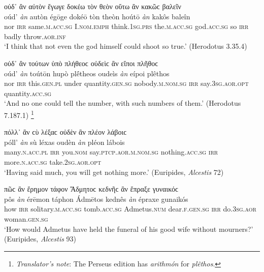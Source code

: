 \begin{exe}
\ex ούδ᾽ ἂν αὐτὸν ἔγωγε δοκέω τὸν θεὸν οὕτω ἂν κακῶϲ βαλεῖν\\
\gll oúd' \emph{àn} autòn égōge dokéō tòn theòn hoútō \emph{àn} kakôs baleîn\\
nor \textsc{irr} same.\textsc{m.acc.sg} I.\textsc{nom.emph} think.\textsc{1sg.prs} the.\textsc{m.acc.sg} god.\textsc{acc.sg} so \textsc{irr} badly throw.\textsc{aor.inf}\\
\trans `I think that not even the god himself could shoot so true.' (Herodotus 3.35.4)
\label{multian22}
\end{exe}

\begin{exe}
\ex οὐδ᾽ ἂν τούτων ὑπὸ πλήθεοϲ οὐδεὶϲ ἂν εἴποι πλῆθοϲ\\
\gll oúd' \emph{àn} toútōn hupò plḗtheos oudeìs \emph{àn} eípoi plêthos\\
nor \textsc{irr} this.\textsc{gen.pl} under quantity.\textsc{gen.sg} nobody.\textsc{m.nom.sg} \textsc{irr} say.\textsc{3sg.aor.opt} quantity.\textsc{acc.sg}\\
\trans `And no one could tell the number, with such numbers of them.' (Herodotus 7.187.1)
\label{multian23}\footnote{\emph{Translator's note}: The Perseus edition has \textit{arithmón} for \textit{plêthos}.}
\end{exe}

\begin{exe}
\ex πόλλ᾽ ἂν ϲὺ λέξαϲ οὐδὲν ἂν πλέον λάβοιϲ\\
\gll póll' \emph{àn} sù léxas oudèn \emph{àn} pléon lábois\\
many.\textsc{n.acc.pl} \textsc{irr} you.\textsc{nom} say.\textsc{ptcp.aor.m.nom.sg} nothing.\textsc{acc.sg} \textsc{irr} more.\textsc{n.acc.sg} take.\textsc{2sg.aor.opt}\\
\trans `Having said much, you will get nothing more.' (Euripides, \textit{Alcestis} 72)
\label{multian24}
\end{exe}

\begin{exe}
\ex πῶϲ ἂν ἔρημον τάφον Ἄδμητοϲ κεδνῆϲ ἂν ἔπραξε γυναικόϲ\\
\gll pôs \emph{àn} érēmon táphon Ádmētos kednês \emph{àn} épraxe gunaikós\\
how \textsc{irr} solitary.\textsc{m.acc.sg} tomb.\textsc{acc.sg} Admetus.\textsc{num} dear.\textsc{f.gen.sg} \textsc{irr} do.\textsc{3sg.aor} woman.\textsc{gen.sg}\\
\trans `How would Admetus have held the funeral of his good wife without mourners?' (Euripides, \textit{Alcestis} 93)
\label{multian25}
\end{exe}

